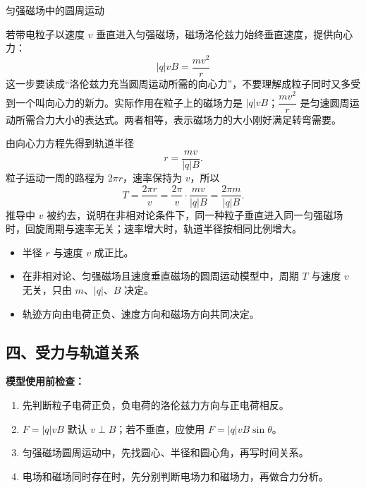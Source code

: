 \begin{conceptbox}{匀强磁场中的圆周运动}

若带电粒子以速度 $v$ 垂直进入匀强磁场，磁场洛伦兹力始终垂直速度，提供向心力：
\[
|q|vB=\frac{mv^2}{r}
\]
这一步要读成“洛伦兹力充当圆周运动所需的向心力”，不要理解成粒子同时又多受到一个叫向心力的新力。实际作用在粒子上的磁场力是 $|q|vB$；$\dfrac{mv^2}{r}$ 是匀速圆周运动所需合力大小的表达式。两者相等，表示磁场力的大小刚好满足转弯需要。

由向心力方程先得到轨道半径
\[
\boxed{r=\frac{mv}{|q|B}}.
\]
粒子运动一周的路程为 $2\pi r$，速率保持为 $v$，所以
\[
T=\frac{2\pi r}{v}
=\frac{2\pi}{v}\cdot\frac{mv}{|q|B}
=\boxed{\frac{2\pi m}{|q|B}}.
\]
推导中 $v$ 被约去，说明在非相对论条件下，同一种粒子垂直进入同一匀强磁场时，回旋周期与速率无关；速率增大时，轨道半径按相同比例增大。

\begin{center}


\label{fig:magnetic-circular-motion}
\end{center}

\begin{itemize}
  \item 半径 $r$ 与速度 $v$ 成正比。
  \item 在非相对论、匀强磁场且速度垂直磁场的圆周运动模型中，周期 $T$ 与速度 $v$ 无关，只由 $m$、$|q|$、$B$ 决定。
  \item 轨迹方向由电荷正负、速度方向和磁场方向共同决定。
\end{itemize}

\end{conceptbox}

\begin{samepage}
\section*{四、受力与轨道关系}

\textbf{模型使用前检查：}
\nopagebreak[4]
\begin{enumerate}
  \item 先判断粒子电荷正负，负电荷的洛伦兹力方向与正电荷相反。
  \item $F=|q|vB$ 默认 $v\perp B$；若不垂直，应使用 $F=|q|vB\sin\theta$。
  \item 匀强磁场圆周运动中，先找圆心、半径和圆心角，再写时间关系。
  \item 电场和磁场同时存在时，先分别判断电场力和磁场力，再做合力分析。
\end{enumerate}
\end{samepage}

